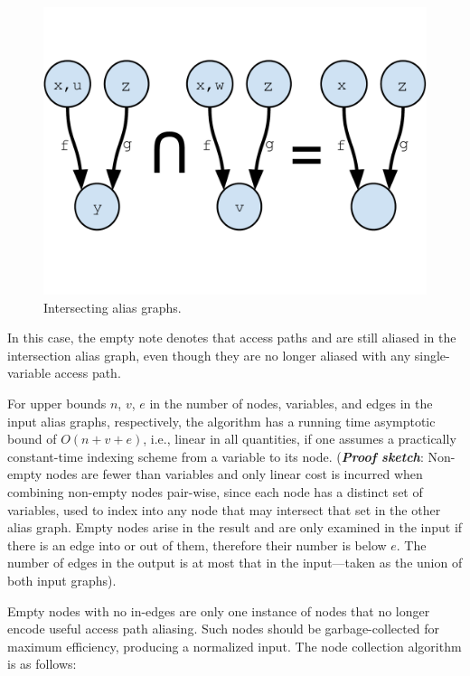 \begin{figure}[ht]
\centering
\includegraphics[trim={0mm 40mm 0mm 30mm},clip,width=0.9\linewidth]{assets/must-data/intersecting-alias-graphs.pdf}
\caption[Alias graphs intersection]{Intersecting alias graphs.}
\label{fig:must-data:intersection}
\end{figure}

In this case, the empty note denotes that access paths  and  are still aliased in the intersection alias graph, even though they are no longer aliased with any single-variable access path.

For upper bounds $n$, $v$, $e$ in the number of nodes, variables, and edges in the input alias graphs, respectively, the algorithm has a running time asymptotic bound of $O(n + v + e)$, i.e., linear in all
quantities, if one assumes a practically constant-time indexing scheme from a variable to its node. (\textbf{\emph{Proof sketch}}: Non-empty nodes are fewer than variables and only linear cost is incurred when combining non-empty nodes pair-wise, since each node has a distinct set of variables, used to index into any node that may intersect that set in the other alias graph. Empty nodes arise in the result and are only examined in the input if there is an edge into or out of them, therefore their number is below $e$. The number of edges in the output is at most that in the input---taken as the union of both input graphs).

Empty nodes with no in-edges are only one instance of nodes that no longer encode useful access path aliasing. Such nodes should be garbage-collected for maximum efficiency, producing a normalized input. The node collection algorithm is as follows:


